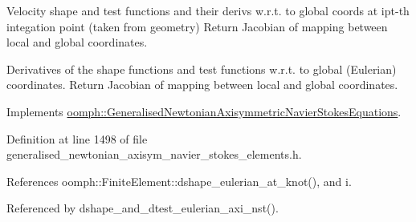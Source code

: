 Velocity shape and test functions and their derivs w.\+r.\+t. to global coords at ipt-\/th integation point (taken from geometry) Return Jacobian of mapping between local and global coordinates. 

Derivatives of the shape functions and test functions w.\+r.\+t. to global (Eulerian) coordinates. Return Jacobian of mapping between local and global coordinates. 

Implements \hyperlink{classoomph_1_1GeneralisedNewtonianAxisymmetricNavierStokesEquations_aea547f513386ed96746cbf55f70d6f78}{oomph\+::\+Generalised\+Newtonian\+Axisymmetric\+Navier\+Stokes\+Equations}.



Definition at line 1498 of file generalised\+\_\+newtonian\+\_\+axisym\+\_\+navier\+\_\+stokes\+\_\+elements.\+h.



References oomph\+::\+Finite\+Element\+::dshape\+\_\+eulerian\+\_\+at\+\_\+knot(), and i.



Referenced by dshape\+\_\+and\+\_\+dtest\+\_\+eulerian\+\_\+axi\+\_\+nst().

\mbox{\label{classoomph_1_1GeneralisedNewtonianAxisymmetricQCrouzeixRaviartElement_a5af9d208617374ffc4b0b7a9af35deaf}} 
